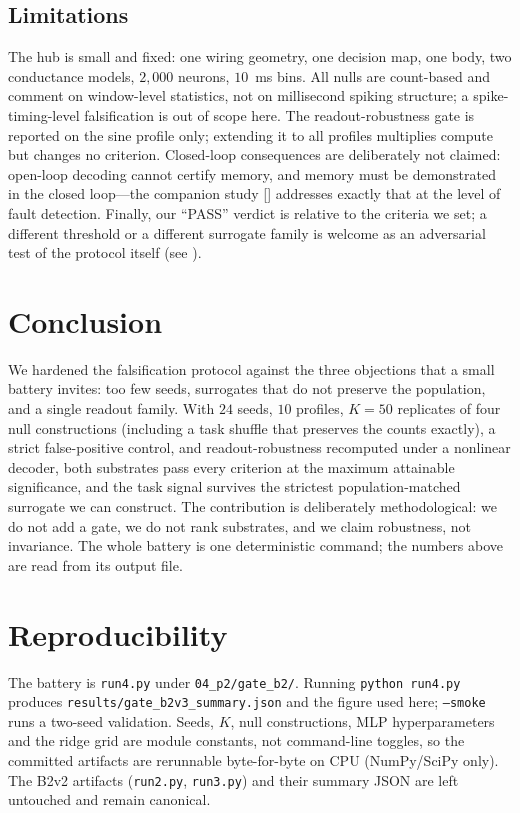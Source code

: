 \documentclass[journal]{IEEEtran}
\begin{document}
\subsection{Limitations}
The hub is small and fixed: one wiring geometry, one decision map, one body, two
conductance models, $2{,}000$ neurons, $10$~ms bins. All nulls are
count-based and comment on window-level statistics, not on millisecond spiking
structure; a spike-timing-level falsification is out of scope here. The
readout-robustness gate is reported on the sine profile only; extending it to all
profiles multiplies compute but changes no criterion. Closed-loop consequences are
deliberately not claimed: open-loop decoding cannot certify memory, and memory
must be demonstrated in the closed loop---the companion study [\cite{b2}]
addresses exactly that at the level of fault detection. Finally, our ``PASS''
verdict is relative to the criteria we set; a different threshold or a different
surrogate family is welcome as an adversarial test of the protocol itself
(see \cite{b1}).

\section{Conclusion}

We hardened the falsification protocol against the three objections that a small
battery invites: too few seeds, surrogates that do not preserve the population,
and a single readout family. With $24$ seeds, $10$ profiles, $K=50$ replicates of
four null constructions (including a task shuffle that preserves the counts
exactly), a strict false-positive control, and readout-robustness recomputed under
a nonlinear decoder, both substrates pass every criterion at the maximum
attainable significance, and the task signal survives the strictest
population-matched surrogate we can construct. The contribution is deliberately
methodological: we do not add a gate, we do not rank substrates, and we claim
robustness, not invariance. The whole battery is one deterministic command; the
numbers above are read from its output file.

\section*{Reproducibility}
The battery is \texttt{run4.py} under \texttt{04\_p2/gate\_b2/}. Running
\texttt{python run4.py} produces \texttt{results/gate\_b2v3\_summary.json} and the
figure used here; \texttt{--smoke} runs a two-seed validation. Seeds, $K$, null
constructions, MLP hyperparameters and the ridge grid are module constants, not
command-line toggles, so the committed artifacts are rerunnable byte-for-byte on
CPU (NumPy/SciPy only). The B2v2 artifacts (\texttt{run2.py}, \texttt{run3.py})
and their summary JSON are left untouched and remain canonical.



\end{document}
